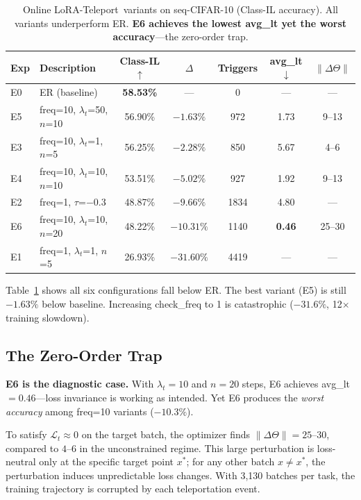 \documentclass[11pt,a4paper]{article}
\newcommand{\toprule}{\hline\hline}
\newcommand{\midrule}{\hline}
\newcommand{\bottomrule}{\hline\hline}
\newcommand{\method}{LoRA-Teleport}
\begin{document}
\begin{table}[t]
\centering
\caption{Online \method\ variants on seq-CIFAR-10 (Class-IL accuracy).
All variants underperform ER.
\textbf{E6 achieves the lowest avg\_lt yet the worst accuracy}---the zero-order trap.}
\label{tab:h7}
\begin{tabular}{|l|l|c|c|c|c|c|}
\toprule
Exp & Description & Class-IL $\uparrow$ & $\Delta$ & Triggers & avg\_lt $\downarrow$ & $\|\Delta\Theta\|$ \\
\midrule
E0 & ER (baseline)                     & \textbf{58.53\%} & ---        & 0    & ---  & ---   \\
\midrule
E5 & freq=10, $\lambda_t$=50, $n$=10   & 56.90\%          & $-1.63\%$  & 972  & 1.73 & 9--13 \\
E3 & freq=10, $\lambda_t$=1,  $n$=5    & 56.25\%          & $-2.28\%$  & 850  & 5.67 & 4--6  \\
E4 & freq=10, $\lambda_t$=10, $n$=10   & 53.51\%          & $-5.02\%$  & 927  & 1.92 & 9--13 \\
E2 & freq=1,  $\tau$=$-0.3$            & 48.87\%          & $-9.66\%$  & 1834 & 4.80 & ---   \\
E6 & freq=10, $\lambda_t$=10, $n$=20   & 48.22\%          & $-10.31\%$ & 1140 & \textbf{0.46} & 25--30 \\
E1 & freq=1,  $\lambda_t$=1,  $n$=5    & 26.93\%          & $-31.60\%$ & 4419 & ---  & ---   \\
\bottomrule
\end{tabular}
\end{table}

Table~\ref{tab:h7} shows all six configurations fall below ER.
The best variant (E5) is still $-1.63\%$ below baseline.
Increasing check\_freq to 1 is catastrophic ($-31.6\%$, 12$\times$ training slowdown).

\subsection{The Zero-Order Trap}

\textbf{E6 is the diagnostic case.}
With $\lambda_t = 10$ and $n=20$ steps, E6 achieves avg\_lt $= 0.46$---loss invariance
is working as intended.
Yet E6 produces the \emph{worst accuracy} among freq=10 variants ($-10.3\%$).

To satisfy $\mathcal{L}_t \approx 0$ on the target batch, the optimizer finds
$\|\Delta\Theta\| = 25$--$30$, compared to $4$--$6$ in the unconstrained regime.
This large perturbation is loss-neutral only at the specific target point $x^*$;
for any other batch $x \neq x^*$, the perturbation induces unpredictable loss changes.
With 3{,}130 batches per task, the training trajectory is corrupted by each teleportation event.
\end{document}
